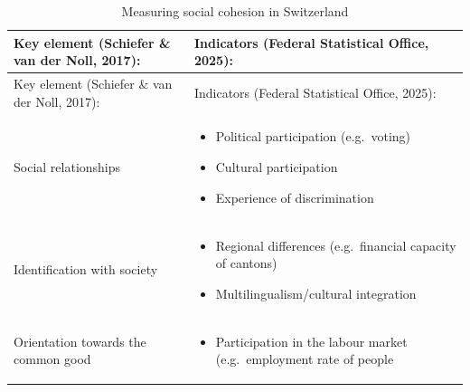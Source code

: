 \documentclass[
  a4paper,
  openany]{book}
\begin{document}
\begin{longtable}[]{@{}
  >{\raggedright\arraybackslash}p{}
  >{\raggedright\arraybackslash}p{}@{}}
\caption{Measuring social cohesion in Switzerland}\tabularnewline
\toprule\noalign{}
\begin{minipage}[b]{\linewidth}\raggedright
Key element (Schiefer \& van der Noll, 2017):
\end{minipage} & \begin{minipage}[b]{\linewidth}\raggedright
Indicators (Federal Statistical Office, 2025):
\end{minipage} \\
\midrule\noalign{}
\endfirsthead
\toprule\noalign{}
\begin{minipage}[b]{\linewidth}\raggedright
Key element (Schiefer \& van der Noll, 2017):
\end{minipage} & \begin{minipage}[b]{\linewidth}\raggedright
Indicators (Federal Statistical Office, 2025):
\end{minipage} \\
\midrule\noalign{}
\endhead
\bottomrule\noalign{}
\endlastfoot
Social relationships & \begin{minipage}[t]{\linewidth}\raggedright
\begin{itemize}
\item
  Political participation (e.g.~voting)
\item
  Cultural participation
\item
  Experience of discrimination
\end{itemize}
\end{minipage} \\
Identification with society &
\begin{minipage}[t]{\linewidth}\raggedright
\begin{itemize}
\item
  Regional differences (e.g.~financial capacity of cantons)
\item
  Multilingualism/cultural integration
\end{itemize}
\end{minipage} \\
Orientation towards the common good &
\begin{minipage}[t]{\linewidth}\raggedright
\begin{itemize}
\item
  Participation in the labour market (e.g.~employment rate of people

\end{itemize}
\end{minipage}
\end{longtable}
\end{document}
